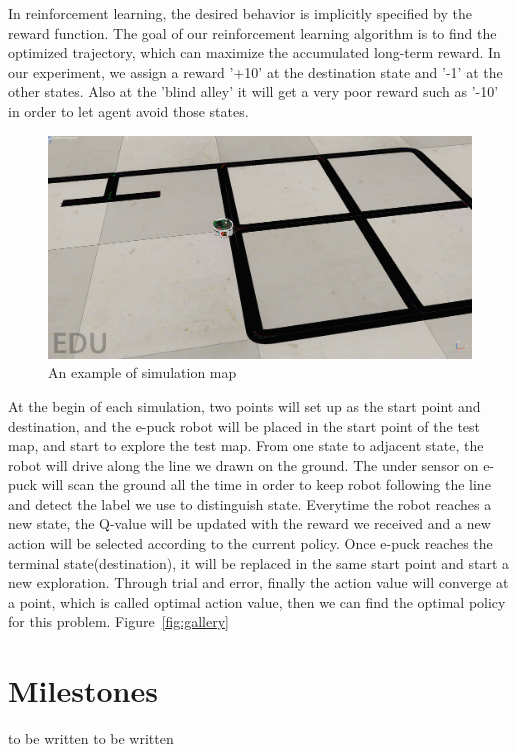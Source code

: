 \documentclass[a4paper, 11pt]{article} %
\begin{document}
In reinforcement learning, the desired behavior is implicitly specified by the reward function. The goal of our reinforcement learning algorithm is to find the optimized trajectory, which can maximize the accumulated long-term reward. In our experiment, we assign a reward '+10' at the destination state and '-1' at the other states. Also at the 'blind alley' it will get a very
poor reward such as '-10' in order to let agent avoid those states.
\begin{figure}[tb]
\centering 
\includegraphics[width=0.9\columnwidth]{simulatemap} 
\caption[An example of a floating figure]{An example of simulation map} %
\label{fig:gallery} 
\end{figure}
At the begin of each simulation, two points will set up as the start point and destination, and the e-puck robot will be placed in the start point of the test map, and start to explore the test map. From one state to adjacent state, the robot will drive along the line we drawn on the ground. The under sensor on e-puck will scan the ground all the time in order to keep robot following the line and detect the label we use to distinguish state. Everytime the robot reaches a new state, the Q-value will be updated with the reward we received and a new action will be selected according to the current policy. Once e-puck reaches the terminal state(destination), it will be replaced in the same start point and start a new exploration. Through trial and error, finally the action value will converge at a point, which is called optimal action value, then we can find the optimal policy for this problem.
Figure~\vref{fig:gallery} 

\section{Milestones}
to be written
to be written









\end{document}
